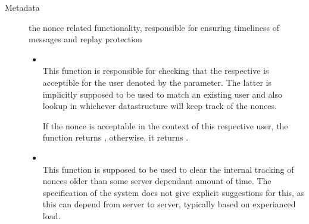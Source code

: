 \begin{description}
\begin{itemize}
  \end{itemize}
  \item[Metadata] the nonce related functionality, responsible for ensuring timeliness of messages and replay protection
  \begin{itemize}
  \item {} \\
  This function is responsible for checking that the respective  is acceptible for the user denoted by the  parameter.
  The latter is implicitly supposed to be used to match an existing user and also lookup in whichever datastructure will keep track of the nonces.

  If the nonce is acceptable in the context of this respective user, the function returns , otherwise, it returns .

  \item {} \\
  This function is supposed to be used to clear the internal tracking of nonces older than some server dependant amount of time.
  The specification of the system does not give explicit suggestions for this, as this can depend from server to server, typically based on experianced load.
  \end{itemize}
\end{description}


